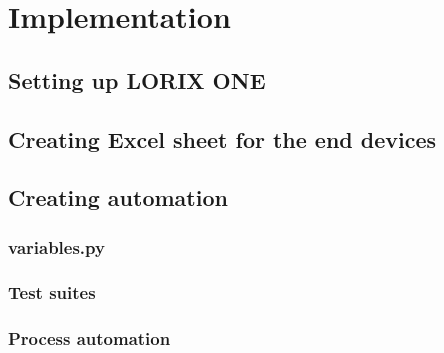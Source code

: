 
\chapter{Implementation} \label{ch:impl}
\section{Setting up LORIX ONE}
\section{Creating Excel sheet for the end devices}
\section{Creating automation}
\subsection{variables.py}
\subsection{Test suites}
\subsection{Process automation}


\clearpage %

